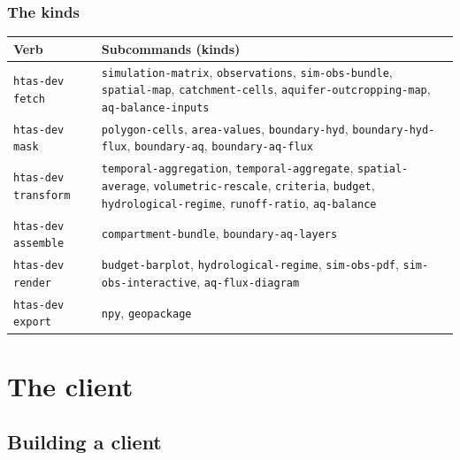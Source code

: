 \documentclass[11pt]{article}
\begin{document}
\subsubsection*{The kinds}

\begin{center}
\small
\begin{tabularx}{\textwidth}{>{\raggedright\arraybackslash}l >{\raggedright\arraybackslash}X}
\toprule
\textbf{Verb} & \textbf{Subcommands (kinds)} \\
\midrule
\texttt{htas-dev fetch} & \texttt{simulation-matrix}, \texttt{observations}, \texttt{sim-obs-bundle}, \texttt{spatial-map}, \texttt{catchment-cells}, \texttt{aquifer-outcropping-map}, \texttt{aq-balance-inputs} \\
\texttt{htas-dev mask} & \texttt{polygon-cells}, \texttt{area-values}, \texttt{boundary-hyd}, \texttt{boundary-hyd-flux}, \texttt{boundary-aq}, \texttt{boundary-aq-flux} \\
\texttt{htas-dev transform} & \texttt{temporal-aggregation}, \texttt{temporal-aggregate}, \texttt{spatial-average}, \texttt{volumetric-rescale}, \texttt{criteria}, \texttt{budget}, \texttt{hydrological-regime}, \texttt{runoff-ratio}, \texttt{aq-balance} \\
\texttt{htas-dev assemble} & \texttt{compartment-bundle}, \texttt{boundary-aq-layers} \\
\texttt{htas-dev render} & \texttt{budget-barplot}, \texttt{hydrological-regime}, \texttt{sim-obs-pdf}, \texttt{sim-obs-interactive}, \texttt{aq-flux-diagram} \\
\texttt{htas-dev export} & \texttt{npy}, \texttt{geopackage} \\
\bottomrule
\end{tabularx}
\end{center}

\section{The client}\label{sec:client}

\subsection{Building a client}
\end{document}
